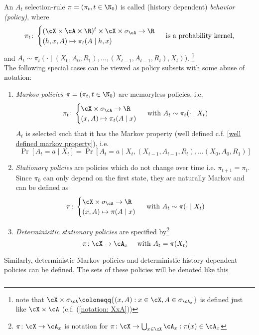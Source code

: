 \begin{definition} 
	An \(A_t\) selection-rule \(\pi=(\pi_t,t\in\N_0)\) is called (history dependent) \emph{behavior (policy)}, where
	\[ 
		\pi_t\colon
		\begin{cases}
			(\cX\times\cA\times\R)^t\times\cX\times\sigma_{\cA} \to \R \\
			(h,x,A)\mapsto \pi_t(A\mid h,x)
		\end{cases} \text{ is a probability kernel,}
	\]
	and \(A_t\sim \pi_t(\cdot\mid (X_0,A_0,R_1), \dots,(X_{t-1},A_{t-1},R_t),X_t))\).
	\footnote{ 
		note that \(\cX\times\sigma_\cA\coloneqq \{(x,A): x\in\cX, A\in\sigma_{\cA_x} \} \) is defined just like \(\cX\times\cA\) (c.f. (\ref{notation: XxA}))
	 } \\
	The following special cases can be viewed as policy subsets with some abuse of notation:
	\begin{enumerate}
		\item \emph{Markov policies} \(\pi=(\pi_t,t\in\N_0)\) are memoryless policies, i.e.
		\[
			\pi_t\colon
			\begin{cases}
				\cX\times\sigma_{\cA} \to \R \\
				(x,A)\mapsto \pi_t(A\mid x)
			\end{cases} 
			\text{ with } A_t\sim \pi_t(\cdot\mid X_t)
		\]
		\(A_t\) is selected such that it has the Markov property (well defined c.f. \ref{well defined markov property}), i.e.
		\[\Pr[A_t=a\mid X_t]=\Pr[A_t=a\mid X_t, (X_{t-1},A_{t-1},R_t), \dots (X_0,A_0,R_1)] \]
		\item \emph{Stationary policies} are policies which do not change over time i.e. \(\pi_{t+1}=\pi_t\). Since \(\pi_0\) can only depend on the first state, they are naturally Markov and can be defined as
		\[
			\pi\colon 
			\begin{cases}
				\cX\times\sigma_{\cA}\to\R\\
				(x,A)\mapsto \pi(A\mid x)
			\end{cases} 
			\text{ with } A_t\sim\pi(\cdot\mid X_t) 
		\]
		\item \emph{Determinisitic stationary policies} are specified by\footnote{
			\(\pi\colon\cX\to\cA_x\) is notation for \(\pi\colon\cX\to\bigcup_{x\in\cX} \cA_x : \pi(x)\in\cA_x \)
		}
		\[
			\pi\colon\cX\to\cA_x \quad\text{ with }A_t=\pi(X_t)
		\]
	\end{enumerate}
	Similarly, deterministic Markov policies and deterministic history dependent policies can be defined. The sets of these policies will be denoted like this
	\[
	\begin{tikzcd}[row sep = small, column sep = small]

\end{tikzcd}\]
\end{definition}
